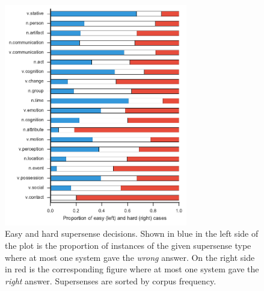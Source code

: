 \documentclass[11pt,letterpaper]{article}
\begin{document}
\begin{figure}
		\includegraphics[width=8cm]{figs/proportion_of_easy_and_hard_supersenses.pdf}
	\caption{Easy and hard supersense decisions. Shown in blue in the left side of the plot is the proportion of instances of the given supersense type where at most one system gave the \emph{wrong} answer. On the right side in red is the corresponding figure where at most one system gave the \emph{right} answer. Supersenses are sorted by corpus frequency.}
	\label{fig:easy-and-hard-supersenses}
\end{figure}
\end{document}
